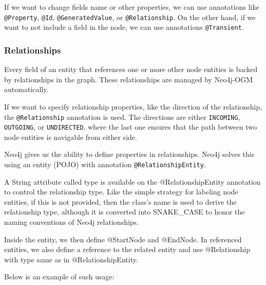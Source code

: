 If we want to change fields name or other properties, we can use annotations like \texttt{@Property}, \texttt{@Id}, \texttt{@GeneratedValue}, or \texttt{@Relationship}. On the other hand,
if we want to not include a field in the node, we can use annotations \texttt{@Transient}.

\subsubsection {Relationships}

Every field of an entity that references one or more other node entities is backed by relationships in the graph. These relationships are managed by Neo4j-OGM automatically.

If we want to specify relationship properties, like the direction of the relationship, the \texttt{@Relationship} annotation is used. The directions are either \texttt{INCOMING},
\texttt{OUTGOING}, or \texttt{UNDIRECTED}, where the last one ensures that the path between two node entities is navigable from either side.

Neo4j gives us the ability to define properties in relationships. Neo4j solves this using an entity (POJO) with annotation \texttt{@RelationshipEntity}.

A String attribute called type is available on the @RelationshipEntity annotation to control the relationship type. Like the simple strategy for labeling node entities,
if this is not provided, then the class's name is used to derive the relationship type, although it is converted into SNAKE\_CASE to honor
the naming conventions of Neo4j relationships. \cite{noauthor_reference_nodate}

Inside the entity, we then define @StartNode and @EndNode. In referenced entities, we also define a reference to
the related entity and use @Relationship with type same as in @RelationshipEntity.

Below is an example of such usage:


